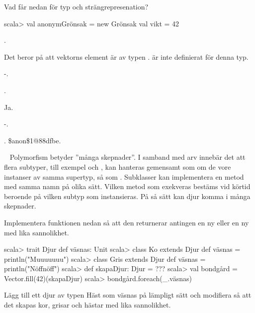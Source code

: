Vad får  nedan för typ och strängrepresenation?
\begin{REPL}
scala> val anonymGrönsak = new Grönsak { val vikt = 42 }
\end{REPL}



\SOLUTION


\TaskSolved \what


\SubtaskSolved  {}.

\SubtaskSolved  Det beror på att vektorns element är av typen .  är inte definierat för denna typ.

\SubtaskSolved  -.

\SubtaskSolved  {}.

\SubtaskSolved  Ja.

\SubtaskSolved  -.

\SubtaskSolved  {}. \$anon\$1@88dfbe.


\QUESTEND







\QUESTBEGIN

\Task  \what~  Polymorfism betyder ''många skepnader''. I samband med arv  innebär det att flera subtyper, till exempel  och , kan hanteras gemensamt som om de vore instanser av samma supertyp, så som . Subklasser kan implementera en metod med samma namn på olika sätt. Vilken metod som exekveras bestäms vid körtid beroende på vilken subtyp som instansieras. På så sätt kan djur komma i många skepnader.

\Subtask Implementera funktionen  nedan så att den returnerar antingen en ny  eller en ny  med lika sannolikhet.

\begin{REPL}
scala> trait Djur { def väsnas: Unit }
scala> class Ko   extends Djur { def väsnas = println("Muuuuuuu") }
scala> class Gris extends Djur { def väsnas = println("Nöffnöff") }
scala> def skapaDjur: Djur = ???
scala> val bondgård = Vector.fill(42)(skapaDjur)
scala> bondgård.foreach(_.väsnas)
\end{REPL}

\Subtask Lägg till ett djur av typen Häst som väsnas på lämpligt sätt och modifiera  så att det skapas kor, grisar och hästar med lika sannolikhet.




